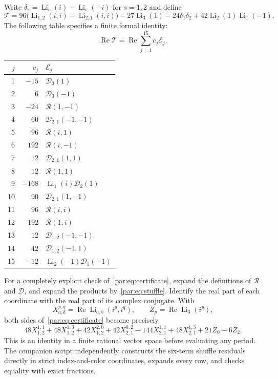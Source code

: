 \documentclass[11pt,a4paper]{article}
\numberwithin{equation}{section}
\theoremstyle{definition}
\theoremstyle{remark}
\DeclareMathOperator{\Li}{Li}
\begin{document}
Write $\delta_s=\Li_s(i)-\Li_s(-i)$ for $s=1,2$ and define
\begin{equation}\label{par:eq:target}
 \mathcal T=
 96\bigl(\Li_{1,2}(i,i)-\Li_{2,1}(i,i)\bigr)
 -27\Li_3(1)-24\delta_1\delta_2
 +42\Li_2(1)\Li_1(-1).
\end{equation}
The following table specifies a finite formal identity:
\begin{equation}\label{par:eq:certificate}
 \operatorname{Re}\mathcal T
   =\operatorname{Re}\sum_{j=1}^{15}c_j\mathcal E_j.
\end{equation}
\begin{center}
\begin{tabular}{r r l}
\hline
$j$ & $c_j$ & $\mathcal E_j$ \\
\hline
1 & $-15$ & $\mathcal D_3(1)$ \\
2 & $6$ & $\mathcal D_3(-1)$ \\
3 & $-24$ & $\mathcal R(1,-1)$ \\
4 & $60$ & $\mathcal D_{2,1}(-1,-1)$ \\
5 & $96$ & $\mathcal R(i,1)$ \\
6 & $192$ & $\mathcal R(i,-1)$ \\
7 & $12$ & $\mathcal D_{2,1}(1,1)$ \\
8 & $12$ & $\mathcal R(1,1)$ \\
9 & $-168$ & $\Li_1(i)\mathcal D_2(1)$ \\
10 & $90$ & $\mathcal D_{2,1}(1,-1)$ \\
11 & $96$ & $\mathcal R(i,i)$ \\
12 & $192$ & $\mathcal R(1,i)$ \\
13 & $12$ & $\mathcal D_{1,2}(-1,-1)$ \\
14 & $42$ & $\mathcal D_{1,2}(-1,1)$ \\
15 & $-12$ & $\Li_2(-1)\mathcal D_1(-1)$ \\
\hline
\end{tabular}
\end{center}

For a completely explicit check of~\eqref{par:eq:certificate}, expand
the definitions of $\mathcal R$ and $\mathcal D$, and expand the products
by~\eqref{par:eq:stuffle}. Identify the real part of each coordinate with
the real part of its complex conjugate. With
\[
 X_{a,b}^{p,q}=\operatorname{Re}\Li_{a,b}(i^p,i^q),
 \qquad Z_p=\operatorname{Re}\Li_3(i^p),
\]
both sides of~\eqref{par:eq:certificate} become precisely
\begin{equation}\label{par:eq:expanded-certificate}
 48X_{1,2}^{1,1}+48X_{1,2}^{1,3}+42X_{1,2}^{2,0}
 +42X_{2,1}^{0,2}-144X_{2,1}^{1,1}+48X_{2,1}^{1,3}
 +21Z_0-6Z_2.
\end{equation}
This is an identity in a finite rational vector space before evaluating
any period. The companion script independently constructs the six-term
shuffle residuals directly in strict index-and-color coordinates,
expands every row, and checks equality with exact fractions.
\end{document}
